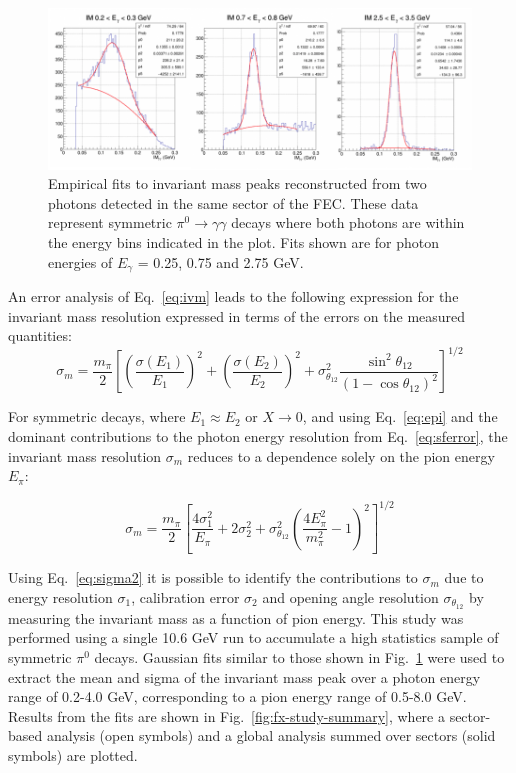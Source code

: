 \begin{figure}[h]
\centering
\includegraphics[width=1.0\columnwidth,keepaspectratio]{img/fx-pi0-fits.png}
\caption[]{Empirical fits to invariant mass peaks reconstructed from two photons detected in the same sector of the FEC.  These data represent symmetric $\pi^0 \rightarrow \gamma \gamma$ decays where both photons are within the energy bins indicated in the plot. Fits shown are for photon energies of $E_{\gamma}$ = 0.25, 0.75 and 2.75 GeV.}
\label{fig:fx-pi0-fits}
\end{figure}

An error analysis of Eq.~\ref{eq:ivm} leads to the following expression for the invariant mass resolution expressed in terms of the errors on the measured quantities:
\begin{equation}
\sigma_m  = \frac{m_{\pi}}{2}\left[\left(\frac{\sigma(E_1)}{E_1}\right)^2 + \left(\frac{\sigma(E_2)}{E_2}\right)^2 + \sigma^2_{\theta_{12}}\frac{\sin^2 \theta_{12}}{(1-\cos \theta_{12})^2}\right]^{1/2}
\label{eq:sigmam1}
\end{equation}

For symmetric decays, where $E_1 \approx E_2$ or $X \rightarrow 0$, and using Eq.~\ref{eq:epi} and the dominant contributions to the photon energy resolution from Eq.~\ref{eq:sferror}, the invariant mass resolution $\sigma_m$ reduces to a dependence solely on the pion energy $E_{\pi}$:

\begin{equation}
\sigma_m = \frac{m_{\pi}}{2}\left[\frac{4 \sigma^2_1}{E_{\pi}} + 2 \sigma^2_2 + \sigma^2_{\theta_{12}}\left(\frac{4 E^2_{\pi}}{m^2_{\pi}}-1\right)^2\right]^{1/2} 
\label{eq:sigma2}
\end{equation}

Using Eq.~\ref{eq:sigma2} it is possible to identify the contributions to $\sigma_m$ due to energy resolution $\sigma_1$, calibration error $\sigma_2$ and opening angle resolution $\sigma_{\theta_{12}}$ by measuring the invariant mass as a function of pion energy.  This study was performed using a single 10.6 GeV run to accumulate a high statistics sample of symmetric $\pi^{0}$ decays.  Gaussian fits similar to those shown in Fig.~\ref{fig:fx-pi0-fits} were used to extract the mean and sigma of the invariant mass peak over a photon energy range of 0.2-4.0 GeV, corresponding to a pion energy range of 0.5-8.0 GeV.  Results from the fits are shown in Fig.~\ref{fig:fx-study-summary}, where a sector-based analysis (open symbols) and a global analysis summed over sectors (solid symbols) are plotted.  

